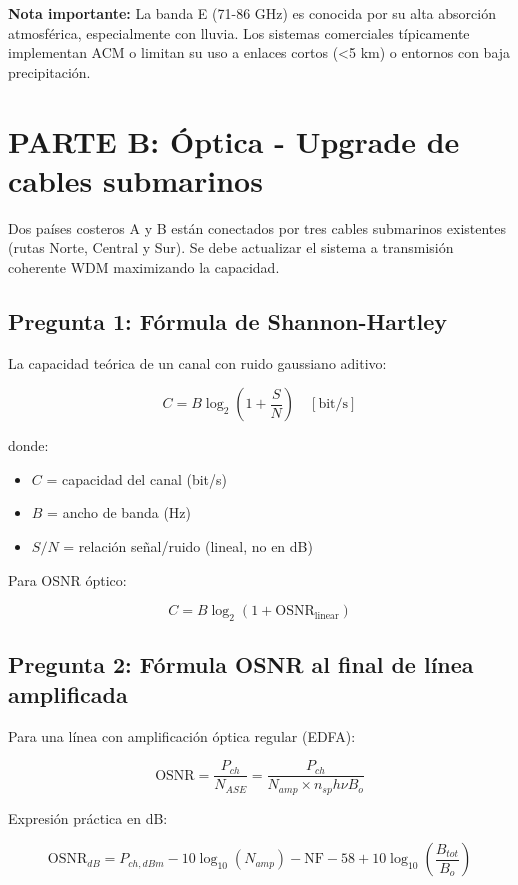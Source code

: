 \documentclass[12pt,a4paper]{extarticle}
\begin{document}
\textbf{Nota importante:} La banda E (71-86 GHz) es conocida por su alta absorción atmosférica, especialmente con lluvia. Los sistemas comerciales típicamente implementan ACM o limitan su uso a enlaces cortos (<5 km) o entornos con baja precipitación.

\newpage

\section*{PARTE B: Óptica - Upgrade de cables submarinos}

Dos países costeros A y B están conectados por tres cables submarinos existentes (rutas Norte, Central y Sur). Se debe actualizar el sistema a transmisión coherente WDM maximizando la capacidad.

\subsection*{Pregunta 1: Fórmula de Shannon-Hartley}

La capacidad teórica de un canal con ruido gaussiano aditivo:

$$\boxed{C = B \log_2\left(1 + \frac{S}{N}\right) \quad [\text{bit/s}]}$$

donde:
\begin{itemize}
    \item $C$ = capacidad del canal (bit/s)
    \item $B$ = ancho de banda (Hz)
    \item $S/N$ = relación señal/ruido (lineal, no en dB)
\end{itemize}

Para OSNR óptico:

$$C = B \log_2(1 + \text{OSNR}_{\text{linear}})$$

\subsection*{Pregunta 2: Fórmula OSNR al final de línea amplificada}

Para una línea con amplificación óptica regular (EDFA):

$$\boxed{\text{OSNR} = \frac{P_{ch}}{N_{ASE}} = \frac{P_{ch}}{N_{amp} \times n_{sp} h \nu B_o}}$$

Expresión práctica en dB:

$$\boxed{\text{OSNR}_{dB} = P_{ch,dBm} - 10\log_{10}(N_{amp}) - \text{NF} - 58 + 10\log_{10}\left(\frac{B_{tot}}{B_o}\right)}$$
\end{document}
